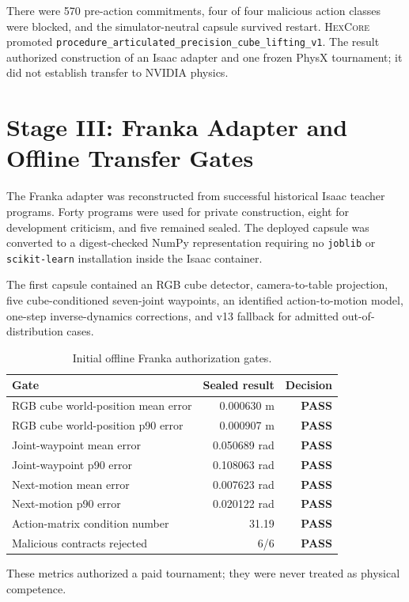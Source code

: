 \documentclass[11pt,a4paper]{article}
\newcommand{\HexCore}{\textsc{HexCore}}
\newcommand{\pass}{\textcolor{green!45!black}{\textbf{PASS}}}
\begin{document}
There were 570 pre-action commitments, four of four malicious action classes
were blocked, and the simulator-neutral capsule survived restart.  \HexCore{}
promoted \texttt{procedure\_articulated\_precision\_cube\_lifting\_v1}.
The result authorized construction of an Isaac adapter and one frozen PhysX
tournament; it did not establish transfer to NVIDIA physics.

\section{Stage III: Franka Adapter and Offline Transfer Gates}

The Franka adapter was reconstructed from successful historical Isaac teacher
programs.  Forty programs were used for private construction, eight for
development criticism, and five remained sealed.  The deployed capsule was
converted to a digest-checked NumPy representation requiring no
\texttt{joblib} or \texttt{scikit-learn} installation inside the Isaac
container.

The first capsule contained an RGB cube detector, camera-to-table projection,
five cube-conditioned seven-joint waypoints, an identified action-to-motion
model, one-step inverse-dynamics corrections, and v13 fallback for admitted
out-of-distribution cases.

\begin{table}[H]
\centering
\caption{Initial offline Franka authorization gates.}
\begin{tabular}{lrr}
\toprule
Gate & Sealed result & Decision \\
\midrule
RGB cube world-position mean error & 0.000630 m & \pass \\
RGB cube world-position p90 error & 0.000907 m & \pass \\
Joint-waypoint mean error & 0.050689 rad & \pass \\
Joint-waypoint p90 error & 0.108063 rad & \pass \\
Next-motion mean error & 0.007623 rad & \pass \\
Next-motion p90 error & 0.020122 rad & \pass \\
Action-matrix condition number & 31.19 & \pass \\
Malicious contracts rejected & 6/6 & \pass \\
\bottomrule
\end{tabular}
\end{table}

These metrics authorized a paid tournament; they were never treated as
physical competence.
\end{document}
